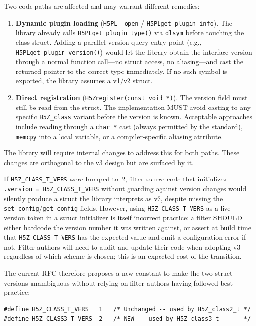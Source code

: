 \documentclass[../HDF5_RFC.tex]{subfiles}
\begin{document}
Two code paths are affected and may warrant different remedies:

\begin{enumerate}
\item \textbf{Dynamic plugin loading} (\texttt{H5PL\_\_open} /
  \texttt{H5PLget\_plugin\_info}).  The library already calls
  \texttt{H5PLget\_plugin\_type()} via \texttt{dlsym} before touching the class
  struct.  Adding a parallel version-query entry point (e.g.,
  \texttt{H5PLget\_plugin\_version()}) would let the library obtain the
  interface version through a normal function call---no struct access, no
  aliasing---and cast the returned pointer to the correct type immediately.
  If no such symbol is exported, the library assumes a v1/v2 struct.

\item \textbf{Direct registration} (\texttt{H5Zregister(const void~*)}).  The
  version field must still be read from the struct.  The implementation MUST
  avoid casting to any specific \texttt{H5Z\_class} variant before the version
  is known.  Acceptable approaches include reading through a \texttt{char~*}
  cast (always permitted by the standard), \texttt{memcpy} into a local
  variable, or a compiler-specific aliasing attribute.
\end{enumerate}

The library will require internal changes to address this for both paths.
These changes are orthogonal to the v3 design but are surfaced by it.

If \texttt{H5Z\_CLASS\_T\_VERS} were bumped to~2, filter source code that
initializes \texttt{.version = H5Z\_CLASS\_T\_VERS} without guarding against version
changes would silently produce a struct the library interprets as v3, despite
missing the \texttt{set\_config}/\texttt{get\_config} fields.  However, using
\texttt{H5Z\_CLASS\_T\_VERS} as a live version token in a struct initializer is itself
incorrect practice: a filter SHOULD either hardcode the version number it was
written against, or assert at build time that \texttt{H5Z\_CLASS\_T\_VERS} has the
expected value and emit a configuration error if not.  Filter authors will need
to audit and update their code when adopting v3 regardless of which scheme is
chosen; this is an expected cost of the transition.

The current RFC therefore proposes a new constant to make the two struct
versions unambiguous without relying on filter authors having followed best
practice:

\begin{verbatim}
#define H5Z_CLASS_T_VERS   1   /* Unchanged -- used by H5Z_class2_t */
#define H5Z_CLASS3_T_VERS  2   /* NEW -- used by H5Z_class3_t       */
\end{verbatim}
\end{document}
